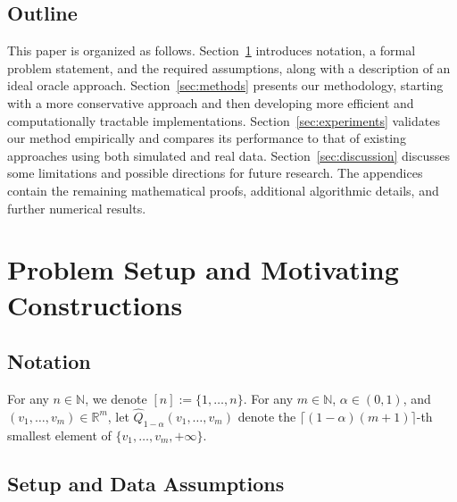 \subsection{Outline}

This paper is organized as follows.
Section~\ref{sec:preliminaries} introduces notation, a formal problem statement, and the required assumptions, along with a description of an ideal oracle approach.
Section~\ref{sec:methods} presents our methodology, starting with a more conservative approach and then developing more efficient and computationally tractable implementations.
Section~\ref{sec:experiments} validates our method empirically and compares its performance to that of existing approaches using both simulated and real data.
Section~\ref{sec:discussion} discusses some limitations and possible directions for future research.
The appendices contain the remaining mathematical proofs, additional algorithmic details, and further numerical results.
 
\section{Problem Setup and Motivating Constructions}
\label{sec:preliminaries}

\subsection{Notation}

For any $n \in \mathbb{N}$, we denote $[n] := \{1,\ldots,n\}$.
For any $m\in\mathbb{N}$, $\alpha\in(0,1)$, and
$(v_1,\ldots,v_m)\in\mathbb{R}^m$, let
$\widehat Q_{1-\alpha}(v_1,\ldots,v_m)$
denote the $\lceil(1-\alpha)(m+1)\rceil$-th smallest element of
$\{v_1,\ldots,v_m,+\infty\}$.

\subsection{Setup and Data Assumptions}

